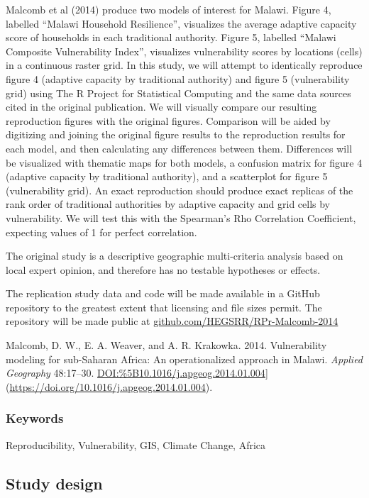 \documentclass[
]{article}
\begin{document}
Malcomb et al (2014) produce two models of interest for Malawi. Figure
4, labelled ``Malawi Household Resilience'', visualizes the average
adaptive capacity score of households in each traditional authority.
Figure 5, labelled ``Malawi Composite Vulnerability Index'', visualizes
vulnerability scores by locations (cells) in a continuous raster grid.
In this study, we will attempt to identically reproduce figure 4
(adaptive capacity by traditional authority) and figure 5 (vulnerability
grid) using The R Project for Statistical Computing and the same data
sources cited in the original publication. We will visually compare our
resulting reproduction figures with the original figures. Comparison
will be aided by digitizing and joining the original figure results to
the reproduction results for each model, and then calculating any
differences between them. Differences will be visualized with thematic
maps for both models, a confusion matrix for figure 4 (adaptive capacity
by traditional authority), and a scatterplot for figure 5 (vulnerability
grid). An exact reproduction should produce exact replicas of the rank
order of traditional authorities by adaptive capacity and grid cells by
vulnerability. We will test this with the Spearman's Rho Correlation
Coefficient, expecting values of 1 for perfect correlation.

The original study is a descriptive geographic multi-criteria analysis
based on local expert opinion, and therefore has no testable hypotheses
or effects.

The replication study data and code will be made available in a GitHub
repository to the greatest extent that licensing and file sizes permit.
The repository will be made public at
\href{https://github.com/HEGSRR/RPr-Malcomb-2014}{github.com/HEGSRR/RPr-Malcomb-2014}

Malcomb, D. W., E. A. Weaver, and A. R. Krakowka. 2014. Vulnerability
modeling for sub-Saharan Africa: An operationalized approach in Malawi.
\emph{Applied Geography} 48:17--30.
\url{DOI:\%5B10.1016/j.apgeog.2014.01.004}{]}(\url{https://doi.org/10.1016/j.apgeog.2014.01.004}).

\hypertarget{keywords}{%
\subsubsection{Keywords}\label{keywords}}

Reproducibility, Vulnerability, GIS, Climate Change, Africa

\hypertarget{study-design}{%
\subsection{Study design}\label{study-design}}
\end{document}
